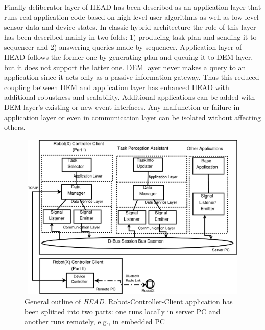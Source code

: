 \documentclass{ifacconf}
\begin{document}
Finally deliberator layer of HEAD has been described as an application layer that runs real-application code based on high-level user algorithms as well as low-level sensor data and device states. In classic hybrid architecture the role of this layer has been described mainly in two folds: 1) producing task plan and sending it to sequencer and 2) answering queries made by sequencer. Application layer of HEAD follows the former one by generating plan and queuing it to DEM layer, but it does not support the latter one. DEM layer never makes a query to an application since it acts only as a passive information gateway. Thus this reduced coupling between DEM and application layer has enhanced HEAD with additional robustness and scalability. Additional applications can be added with DEM layer's existing or new event interfaces. Any malfunction or failure in application layer or even in communication layer can be isolated without affecting others. 
\begin{figure}
\begin{center}
\includegraphics[width=12cm,height=8cm]{./dia-files/concrete-arch}    %
\caption{General outline of {\em HEAD}. Robot-Controller-Client application has been splitted into two parts: one runs locally in server PC and another runs remotely, e.g., in embedded PC} 
\label{fig:abstract-arch}
\end{center}
\end{figure}
\end{document}
